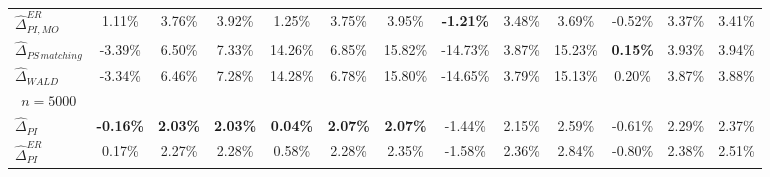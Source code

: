 \documentclass{article}
\begin{document}
\begin{landscape}
\begin{table}[]
{\begin{tabular}{l|lll|lll|lll|lll}
$\widehat{\Delta}_{PI,MO}^{ER}$   &\multicolumn{1}{c}{ 1.11\% }&\multicolumn{1}{c}{ 3.76\% }&\multicolumn{1}{c|}{ 3.92\% }&\multicolumn{1}{c}{ 1.25\% }&\multicolumn{1}{c}{ 3.75\% }&\multicolumn{1}{c|}{ 3.95\% }&\multicolumn{1}{c}{ \textbf{-1.21\%} }&\multicolumn{1}{c}{ 3.48\% }&\multicolumn{1}{c|}{ 3.69\% }&\multicolumn{1}{c}{ -0.52\% }&\multicolumn{1}{c}{ 3.37\% }&\multicolumn{1}{c}{ 3.41\% }\\ 
$\widehat{\Delta}_{PS\,matching}$ &\multicolumn{1}{c}{ -3.39\% }&\multicolumn{1}{c}{ 6.50\% }&\multicolumn{1}{c|}{ 7.33\% }&\multicolumn{1}{c}{ 14.26\% }&\multicolumn{1}{c}{ 6.85\% }&\multicolumn{1}{c|}{ 15.82\% }&\multicolumn{1}{c}{ -14.73\% }&\multicolumn{1}{c}{ 3.87\% }&\multicolumn{1}{c|}{ 15.23\% }&\multicolumn{1}{c}{ \textbf{0.15\%} }&\multicolumn{1}{c}{ 3.93\% }&\multicolumn{1}{c}{ 3.94\% }\\ 
$\widehat{\Delta}_{WALD}$         &\multicolumn{1}{c}{ -3.34\% }&\multicolumn{1}{c}{ 6.46\% }&\multicolumn{1}{c|}{ 7.28\% }&\multicolumn{1}{c}{ 14.28\% }&\multicolumn{1}{c}{ 6.78\% }&\multicolumn{1}{c|}{ 15.80\% }&\multicolumn{1}{c}{ -14.65\% }&\multicolumn{1}{c}{ 3.79\% }&\multicolumn{1}{c|}{ 15.13\% }&\multicolumn{1}{c}{ 0.20\% }&\multicolumn{1}{c}{ 3.87\% }&\multicolumn{1}{c}{ 3.88\% }\\ 
\multicolumn{1}{c|}{$n= 5000 $}          &                                             &                                                                 &                                        &                                             &                                                                 &                                        &                                             &                                                                 &                                        &                                             &                                                                 &                                       \\ 
$\widehat{\Delta}_{PI}$           &\multicolumn{1}{c}{ \textbf{-0.16\%} }&\multicolumn{1}{c}{ \textbf{2.03\%} }&\multicolumn{1}{c|}{ \textbf{2.03\%} }&\multicolumn{1}{c}{ \textbf{0.04\%} }&\multicolumn{1}{c}{ \textbf{2.07\%} }&\multicolumn{1}{c|}{ \textbf{2.07\%} }&\multicolumn{1}{c}{ -1.44\% }&\multicolumn{1}{c}{ 2.15\% }&\multicolumn{1}{c|}{ 2.59\% }&\multicolumn{1}{c}{ -0.61\% }&\multicolumn{1}{c}{ 2.29\% }&\multicolumn{1}{c}{ 2.37\% }\\ 
$\widehat{\Delta}_{PI}^{ER}$      &\multicolumn{1}{c}{ 0.17\% }&\multicolumn{1}{c}{ 2.27\% }&\multicolumn{1}{c|}{ 2.28\% }&\multicolumn{1}{c}{ 0.58\% }&\multicolumn{1}{c}{ 2.28\% }&\multicolumn{1}{c|}{ 2.35\% }&\multicolumn{1}{c}{ -1.58\% }&\multicolumn{1}{c}{ 2.36\% }&\multicolumn{1}{c|}{ 2.84\% }&\multicolumn{1}{c}{ -0.80\% }&\multicolumn{1}{c}{ 2.38\% }&\multicolumn{1}{c}{ 2.51\% }\\ 

\end{tabular}}
\end{table}
\end{landscape}
\end{document}
